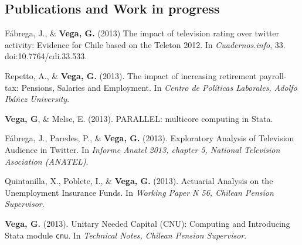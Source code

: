 \documentclass[letterpaper, 11pt]{article}
\renewenvironment{itemize}{
  \begin{list}{}{
    \setlength{\leftmargin}{0.45cm}
  }
}{
  \end{list}
}
\begin{document}
\subsection*{Publications and Work in progress}
\begin{itemize}
\item F\'abrega, J., \& {\bf Vega, G.} (2013) The impact of television rating over twitter activity: Evidence for Chile based on the Teleton 2012. In {\it Cuadernos.info}, 33. doi:10.7764/cdi.33.533.
\item Repetto, A., \& {\bf Vega, G.} (2013). The impact of increasing retirement payroll-tax: Pensions, Salaries and Employment. In {\it Centro de Pol\'iticas Laborales, Adolfo Ib\'a\~nez University}.
\item {\bf Vega, G}, \& Melse, E. (2013). PARALLEL: multicore computing in Stata.
\item F\'abrega, J., Paredes, P., \& {\bf Vega, G.} (2013). Exploratory Analysis of Television Audience in Twitter. In {\it Informe Anatel 2013, chapter 5, National Television Asociation (ANATEL)}.
\item Quintanilla, X., Poblete, I., \& {\bf Vega, G.} (2013). Actuarial Analysis on the Unemployment Insurance Funds. In {\it Working Paper N 56, Chilean Pension Supervisor}.
\item {\bf Vega, G.} (2013). Unitary Needed Capital (CNU): Computing and Introducing Stata module {\tt cnu}. In {\it Technical Notes, Chilean Pension Supervisor}.
\end{itemize}
\end{document}
